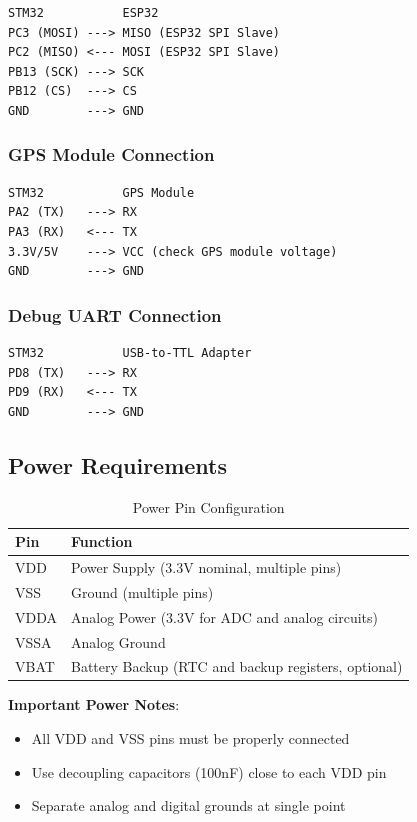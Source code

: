 \documentclass[11pt,a4paper]{article}
\begin{document}
\begin{verbatim}
STM32           ESP32
PC3 (MOSI) ---> MISO (ESP32 SPI Slave)
PC2 (MISO) <--- MOSI (ESP32 SPI Slave)
PB13 (SCK) ---> SCK
PB12 (CS)  ---> CS
GND        ---> GND
\end{verbatim}

\subsubsection{GPS Module Connection}
\begin{verbatim}
STM32           GPS Module
PA2 (TX)   ---> RX
PA3 (RX)   <--- TX
3.3V/5V    ---> VCC (check GPS module voltage)
GND        ---> GND
\end{verbatim}

\subsubsection{Debug UART Connection}
\begin{verbatim}
STM32           USB-to-TTL Adapter
PD8 (TX)   ---> RX
PD9 (RX)   <--- TX
GND        ---> GND
\end{verbatim}

\subsection{Power Requirements}

\begin{table}[H]
\centering
\begin{tabular}{@{}ll@{}}
\toprule
\textbf{Pin} & \textbf{Function} \\
\midrule
VDD & Power Supply (3.3V nominal, multiple pins) \\
VSS & Ground (multiple pins) \\
VDDA & Analog Power (3.3V for ADC and analog circuits) \\
VSSA & Analog Ground \\
VBAT & Battery Backup (RTC and backup registers, optional) \\
\bottomrule
\end{tabular}
\caption{Power Pin Configuration}
\end{table}

\textbf{Important Power Notes}:
\begin{itemize}
    \item All VDD and VSS pins must be properly connected
    \item Use decoupling capacitors (100nF) close to each VDD pin
    \item Separate analog and digital grounds at single point
\end{itemize}
\end{document}
